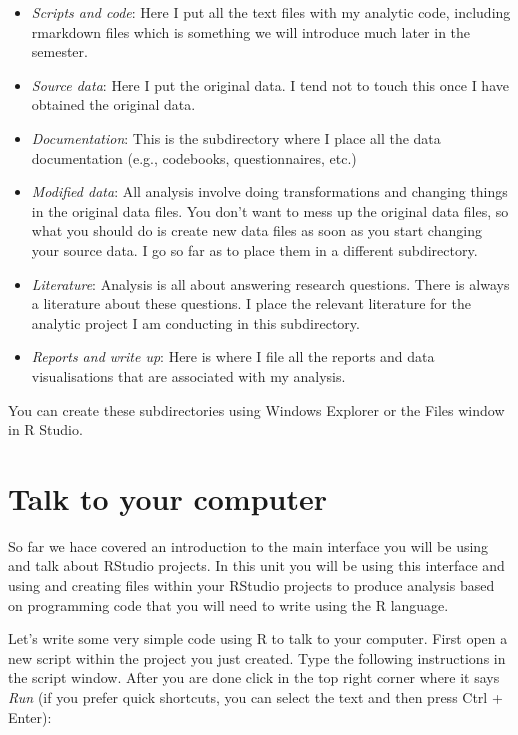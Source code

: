 \documentclass[
]{book}
\begin{document}
\begin{itemize}
\item
  \emph{Scripts and code}: Here I put all the text files with my analytic code, including rmarkdown files which is something we will introduce much later in the semester.
\item
  \emph{Source data}: Here I put the original data. I tend not to touch this once I have obtained the original data.
\item
  \emph{Documentation}: This is the subdirectory where I place all the data documentation (e.g., codebooks, questionnaires, etc.)
\item
  \emph{Modified data}: All analysis involve doing transformations and changing things in the original data files. You don't want to mess up the original data files, so what you should do is create new data files as soon as you start changing your source data. I go so far as to place them in a different subdirectory.
\item
  \emph{Literature}: Analysis is all about answering research questions. There is always a literature about these questions. I place the relevant literature for the analytic project I am conducting in this subdirectory.
\item
  \emph{Reports and write up}: Here is where I file all the reports and data visualisations that are associated with my analysis.
\end{itemize}

You can create these subdirectories using Windows Explorer or the Files window in R Studio.

\hypertarget{talk-to-your-computer}{%
\section{Talk to your computer}\label{talk-to-your-computer}}

So far we hace covered an introduction to the main interface you will be using and talk about RStudio projects. In this unit you will be using this interface and using and creating files within your RStudio projects to produce analysis based on programming code that you will need to write using the R language.

Let's write some very simple code using R to talk to your computer. First open a new script within the project you just created. Type the following instructions in the script window. After you are done click in the top right corner where it says \emph{Run} (if you prefer quick shortcuts, you can select the text and then press Ctrl + Enter):
\end{document}
